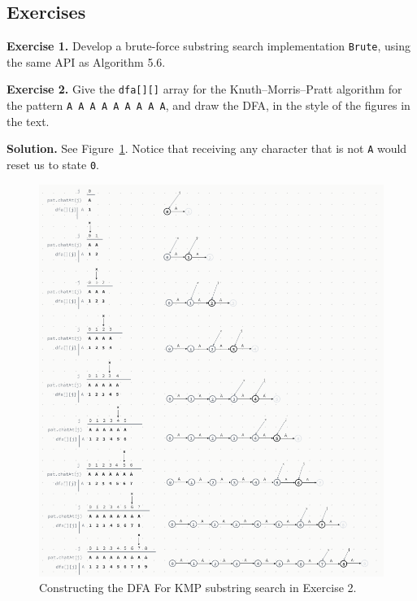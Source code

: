 \documentclass[12pt, a4paper]{article}
\newenvironment{ex}[2][Exercise]
{\par\medskip\noindent \textbf{#1 #2.}}
{\medskip}
\newenvironment{sol}[1][Solution]
{\par\medskip\noindent \textbf{#1.} }
{\medskip}
\begin{document}
	\subsection*{Exercises}
	\begin{ex}{1}
		Develop a brute-force substring search implementation \texttt{Brute},
		using the same API as Algorithm 5.6.
	\end{ex}
	\begin{ex}{2}
		Give the \texttt{dfa[][]} array for the Knuth--Morris--Pratt algorithm for the pattern
		\texttt{A A A A A A A A A}, and draw the DFA, in the style of the figures in the text.
	\end{ex}
	\begin{sol}
		See Figure~\ref{fig:ex-02}. Notice that receiving any character that is not \texttt{A}
		would reset us to state \texttt{0}.
		\begin{figure}
			\centering
			\includegraphics[width=1.0\textwidth]{exercise-02}
			\caption{Constructing the DFA For KMP substring search in Exercise 2.}
			\label{fig:ex-02}
		\end{figure}
	\end{sol}
	
	
	\pagebreak
	\printbibliography
\end{document}
